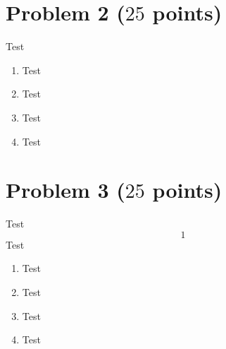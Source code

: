 \documentclass[a4paper]{article}%
\begin{document}
\clearpage %

\clearpage %

\clearpage
{}\clearpage %



\section*{Problem 2 ($25$ points)} 
Test

\begin{enumerate}[label=(\alph*)]
  \item 
  Test
  \item
  Test
  \item 
  Test
  \item 
  Test
\end{enumerate}

\clearpage %

\clearpage %

\clearpage
{}\clearpage %







\section*{Problem 3 ($25$ points)} 
Test
\begin{equation*}
  1
\end{equation*}
Test

\begin{enumerate}[label=(\alph*)]
  \item 
  Test
  \item
  Test
  \item 
  Test
  \item 
  Test
\end{enumerate}

\clearpage %

\clearpage %

\clearpage
{}\clearpage %
\end{document}
